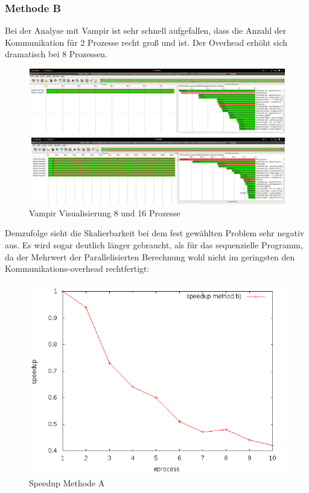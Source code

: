 \documentclass[paper=A4,pagesize=auto,12pt,headinclude=true,footinclude=true,BCOR=0mm,DIV=calc]{scrartcl}
\begin{document}
	\subsubsection{Methode B}
	Bei der Analyse mit Vampir ist sehr schnell aufgefallen, dass die Anzahl der Kommunikation für 2 Prozesse recht groß und ist. Der Overhead erhöht sich dramatisch bei 8 Prozessen.
		\label{vampirB}
		\begin{figure}[H]
			\includegraphics[scale = 0.38]{Prasentation/vampirmethodB.png}
			\caption{Vampir Visualisierung 8 und 16 Prozesse}
		\end{figure}
	Demzufolge sieht die Skalierbarkeit bei dem fest gewählten Problem sehr negativ aus. Es wird sogar deutlich länger gebraucht, als für das sequenzielle Programm, da der Mehrwert der Parallelisierten Berechnung wohl nicht im geringsten den Kommunikations-overhead rechtfertigt:
	\label{speedUpB}
	\begin{figure}[H]
		\includegraphics[scale = 0.55]{Prasentation/speedupPBoost.png}
		\caption{Speedup Methode A}
	\end{figure}
\end{document}
